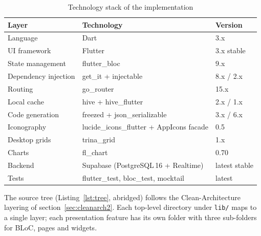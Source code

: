 {\singlespacing
\begin{table}[h]
  \caption{Technology stack of the implementation}
  \label{tab:stack}
  \centering
  \begin{tabular}{lll}
    \toprule
    \textbf{Layer}        & \textbf{Technology}                       & \textbf{Version}\\
    \midrule
    Language              & Dart                                      & 3.x\\
    UI framework          & Flutter                                   & 3.x stable\\
    State management      & flutter\_bloc                             & 9.x\\
    Dependency injection  & get\_it + injectable                      & 8.x / 2.x\\
    Routing               & go\_router                                & 15.x\\
    Local cache           & hive + hive\_flutter                      & 2.x / 1.x\\
    Code generation       & freezed + json\_serializable              & 3.x / 6.x\\
    Iconography           & lucide\_icons\_flutter + AppIcons facade  & 0.5\\
    Desktop grids         & trina\_grid                               & 1.x\\
    Charts                & fl\_chart                                 & 0.70\\
    Backend               & Supabase (PostgreSQL\,16 + Realtime)      & latest stable\\
    Tests                 & flutter\_test, bloc\_test, mocktail       & latest\\
    \bottomrule
  \end{tabular}
\end{table}
}

The source tree (Listing~\ref{lst:tree}, abridged) follows the Clean-Architecture layering of section~\ref{sec:cleanarch2}. Each top-level directory under \texttt{lib/} maps to a single layer; each presentation feature has its own folder with three sub-folders for BLoC, pages and widgets.

